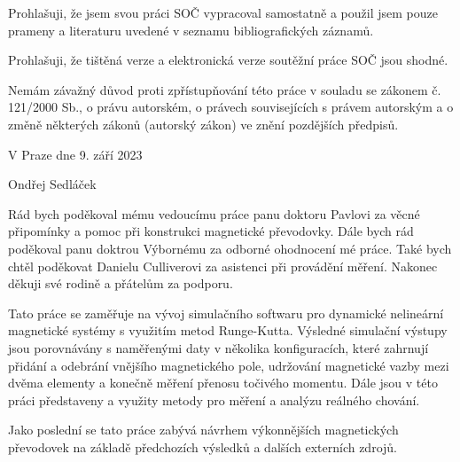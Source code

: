 \documentclass[12pt, a4paper,
 twoside,        %
 openright
]{report}
\newcommand\authorName{Ondřej Sedláček}  %
\begin{document}

\noindent Prohlašuji, že jsem svou práci SOČ vypracoval samostatně a použil jsem pouze prameny a literaturu uvedené v seznamu bibliografických záznamů.

\noindent Prohlašuji, že tištěná verze a elektronická verze soutěžní práce SOČ jsou shodné.

\noindent Nemám závažný důvod proti zpřístupňování této práce v souladu se zákonem č. 121/2000 Sb., o právu autorském, o právech souvisejících s právem autorským a o změně některých zákonů (autorský zákon) ve znění pozdějších předpisů.

\vspace{24 pt}

\noindent V Praze dne 9. září 2023 \dotfill{}

\hspace{6cm} \authorName
\cleardoublepage

\vspace*{0.0\textheight}

\noindent
Rád bych poděkoval mému vedoucímu práce panu doktoru Pavlovi za věcné připomínky a pomoc při konstrukci magnetické převodovky. Dále bych rád poděkoval panu doktrou Výbornému za odborné ohodnocení mé práce. Také bych chtěl poděkovat Danielu Culliverovi za asistenci při provádění měření. Nakonec děkuji své rodině a přátelům za podporu.

\cleardoublepage


\noindent Tato práce se zaměřuje na vývoj simulačního softwaru pro dynamické nelineární magnetické systémy s využitím metod Runge-Kutta. Výsledné simulační výstupy jsou porovnávány s naměřenými daty v několika konfiguracích, které zahrnují přidání a odebrání vnějšího magnetického pole, udržování magnetické vazby mezi dvěma elementy a konečně měření přenosu točivého momentu. Dále jsou v této práci představeny a využity metody pro měření a analýzu reálného chování.

Jako poslední se tato práce zabývá návrhem výkonnějších magnetických převodovek na základě předchozích výsledků a dalších externích zdrojů.
\end{document}
